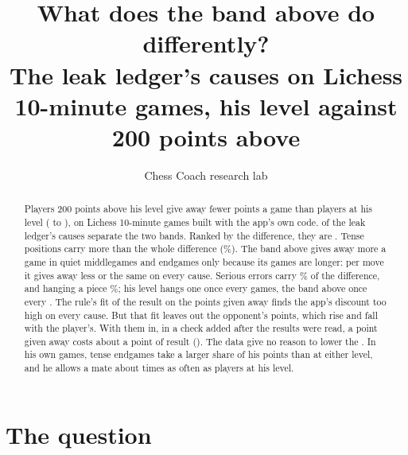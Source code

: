 \documentclass[11pt]{article}
\title{What does the band above do differently?\\[0.3em]
\large The leak ledger's causes on \GamesBuilt{} Lichess 10-minute games, his level against 200 points above}
\author{Chess Coach research lab}
\date{}
\begin{document}
\maketitle

\begin{abstract}
Players 200 points above his level give away \AllGap{} fewer points a game than players at his
level (\AllGapLo{} to \AllGapHi), on \GamesBuilt{} Lichess 10-minute games built with the app's
own code. \SeparateCap{} of the leak ledger's \Causes{} causes separate the two bands. Ranked by the
difference, they are \RankedList. Tense positions carry more than the whole difference
(\TenseShare\%). The band above gives away more a game in quiet middlegames and endgames only
because its games are longer: per move it gives away less or the same on every cause. Serious
errors carry \SeriousDiffShare\% of the difference, and hanging a piece \HangingDiffShare\%; his
level hangs one once every \HisHangingEvery{} games, the band above once every
\AboveHangingEvery. The rule's fit of the result on the points given away finds the app's
\Discount{} discount too high on every cause. But that fit leaves out the opponent's points, which
rise and fall with the player's. With them in, in a check added after the results were read, a
point given away costs about a point of result (\TheirsAll). The data give no reason to lower the
\Discount. In his own games, tense endgames take a larger share of his points than at either level,
and he allows a mate about \MateRatio{} times as often as players at his level.
\end{abstract}

\section{The question}
\end{document}
